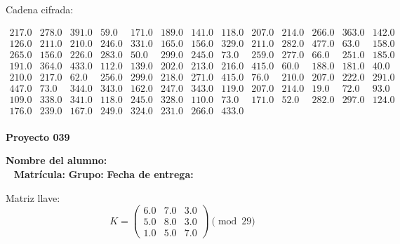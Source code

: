 \documentclass[12pt]{article}
\begin{document}
Cadena cifrada:
\begin{center}
$\begin{array}{lllllllllllll}
217.0 & 278.0 & 391.0 & 59.0 & 171.0 & 189.0 & 141.0 & 118.0 & 207.0 & 214.0 & 266.0 & 363.0 & 142.0\\
126.0 & 211.0 & 210.0 & 246.0 & 331.0 & 165.0 & 156.0 & 329.0 & 211.0 & 282.0 & 477.0 & 63.0 & 158.0\\
265.0 & 156.0 & 226.0 & 283.0 & 50.0 & 299.0 & 245.0 & 73.0 & 259.0 & 277.0 & 66.0 & 251.0 & 185.0\\
191.0 & 364.0 & 433.0 & 112.0 & 139.0 & 202.0 & 213.0 & 216.0 & 415.0 & 60.0 & 188.0 & 181.0 & 40.0\\
210.0 & 217.0 & 62.0 & 256.0 & 299.0 & 218.0 & 271.0 & 415.0 & 76.0 & 210.0 & 207.0 & 222.0 & 291.0\\
447.0 & 73.0 & 344.0 & 343.0 & 162.0 & 247.0 & 343.0 & 119.0 & 207.0 & 214.0 & 19.0 & 72.0 & 93.0\\
109.0 & 338.0 & 341.0 & 118.0 & 245.0 & 328.0 & 110.0 & 73.0 & 171.0 & 52.0 & 282.0 & 297.0 & 124.0\\
176.0 & 239.0 & 167.0 & 249.0 & 324.0 & 231.0 & 266.0 & 433.0\\
\end{array}$
\end{center}

\newpage


\textbf{Proyecto 039}

\textbf{Nombre del alumno:} \underline{\hspace{13cm}}\\\
\vspace{1cm}
\textbf{Matrícula:} \underline{\hspace{4cm}} \hspace{1cm}
\textbf{Grupo:} \underline{\hspace{2cm}}
\textbf{Fecha de entrega:} \underline{\hspace{2cm}}

\medskip

Matriz llave:
\[
K = \begin{pmatrix}
6.0 & 7.0 & 3.0\\
5.0 & 8.0 & 3.0\\
1.0 & 5.0 & 7.0
\end{pmatrix} \pmod{29}
\]
\end{document}
